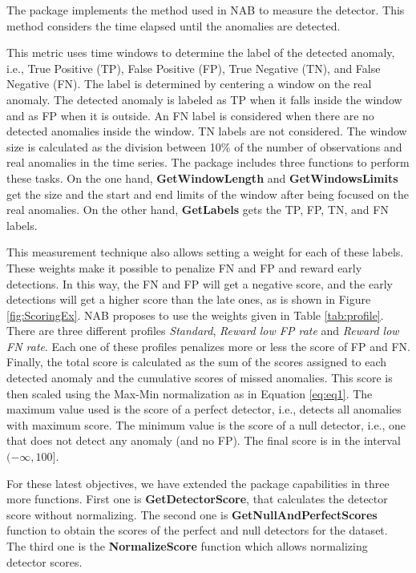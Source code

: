 \documentclass[a4paper]{article}\usepackage[]{graphicx}\usepackage[]{color}
\begin{document}
The  package implements the method used in NAB \cite{7424283} to measure the detector. This method considers the time elapsed until the anomalies are detected.

This metric uses time windows to determine the label of the detected anomaly, i.e., True Positive (TP), False Positive (FP), True Negative (TN), and False Negative (FN). The label is determined by centering a window on the real anomaly. The detected anomaly is labeled as TP when it falls inside the window and as FP when it is outside. An FN label is considered when there are no detected anomalies inside the window. TN labels are not considered. The window size is calculated as the division between 10\% of the number of observations and real anomalies in the time series. The package includes three functions to perform these tasks. On the one hand, \textbf{GetWindowLength} and \textbf{GetWindowsLimits} get the size and the start and end limits of the window after being focused on the real anomalies. On the other hand, \textbf{GetLabels} gets the TP, FP, TN, and FN labels.

This measurement technique also allows setting a weight for each of these labels. These weights make it possible to penalize FN and FP and reward early detections. In this way, the FN and FP will get a negative score, and the early detections will get a higher score than the late ones, as is shown in Figure \ref{fig:ScoringEx}. NAB \cite{7424283} proposes to use the weights given in Table \ref{tab:profile}. There are three different profiles \emph{Standard}, \emph{Reward low FP rate} and \emph{Reward low FN rate}. Each one of these profiles penalizes more or less the score of FP and FN. Finally, the total score is calculated as the sum of the scores assigned to each detected anomaly and the cumulative scores of missed anomalies. This score is then scaled using the Max-Min normalization as in Equation \ref{eq:eq1}. The maximum value used is the score of a perfect detector, i.e., detects all anomalies with maximum score. The minimum value is the score of a null detector, i.e., one that does not detect any anomaly (and no FP). The final score is in the interval $(-\infty, 100]$.

For these latest objectives, we have extended the package capabilities in three more functions. First one is \textbf{GetDetectorScore}, that calculates the detector score without normalizing. The second one is \textbf{GetNullAndPerfectScores} function to obtain the scores of the perfect and null detectors for the dataset. The third one is the \textbf{NormalizeScore} function which allows normalizing detector scores.
\end{document}
